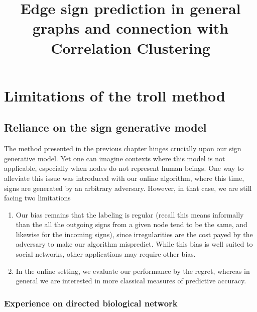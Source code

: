 \documentclass[nobib, a4paper, 10pt, oneside, onecolumn, openany, notitlepage, final,
svgnames, marginals=raggedouter, english,
]{article}
\title{Edge sign prediction in general graphs and connection with Correlation Clustering}
\begin{document}
\maketitle



\section{Limitations of the troll method}
\label{sec:limitations_of_the_troll_method}

\subsection{Reliance on the sign generative model}
\label{sub:reliance_on_the_sign_generative_model}

The method presented in the previous chapter hinges crucially upon our sign generative model. Yet
one can imagine contexts where this model is not applicable, especially when nodes do not represent
human beings. One way to alleviate this issue was introduced with our online algorithm, where this
time, signs are generated by an arbitrary adversary. However, in that case, we are still facing two
limitations
\begin{enumerate}
	\item Our bias remains that the labeling is regular (recall this means informally than the all
		the outgoing signs from a given node tend to be the same, and likewise for the incoming signs),
		since irregularities are the cost payed by the adversary to make our algorithm mispredict. While
		this bias is well suited to social networks, other applications may require other
		bias.
	\item In the online setting, we evaluate our performance by the regret,
		whereas in general we are interested in more classical measures of predictive accuracy.
\end{enumerate}

\subsubsection{Experience on directed biological network}
\label{ssub:experience_on_directed_biological_network}
\end{document}
